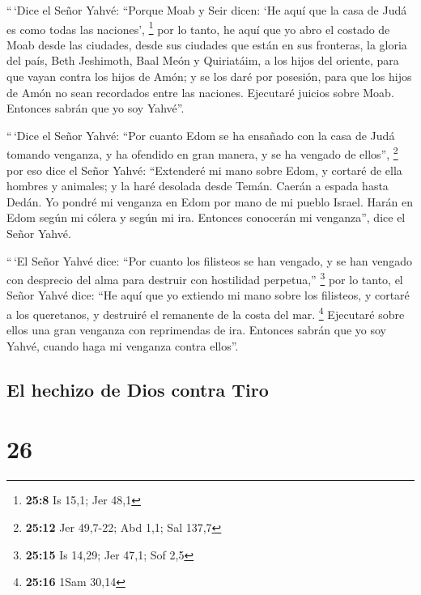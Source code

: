  ``\,`Dice el Señor Yahvé: ``Porque Moab y Seir dicen: `He
aquí que la casa de Judá es como todas las naciones', \footnote{\textbf{25:8}
  Is 15,1; Jer 48,1}  por lo tanto, he aquí que yo abro el
costado de Moab desde las ciudades, desde sus ciudades que están en sus
fronteras, la gloria del país, Beth Jeshimoth, Baal Meón y Quiriatáim,
 a los hijos del oriente, para que vayan contra los hijos
de Amón; y se los daré por posesión, para que los hijos de Amón no sean
recordados entre las naciones.  Ejecutaré juicios sobre
Moab. Entonces sabrán que yo soy Yahvé''.

 ``\,`Dice el Señor Yahvé: ``Por cuanto Edom se ha
ensañado con la casa de Judá tomando venganza, y ha ofendido en gran
manera, y se ha vengado de ellos'', \footnote{\textbf{25:12} Jer
  49,7-22; Abd 1,1; Sal 137,7}  por eso dice el Señor
Yahvé: ``Extenderé mi mano sobre Edom, y cortaré de ella hombres y
animales; y la haré desolada desde Temán. Caerán a espada hasta Dedán.
 Yo pondré mi venganza en Edom por mano de mi pueblo
Israel. Harán en Edom según mi cólera y según mi ira. Entonces conocerán
mi venganza'', dice el Señor Yahvé.

 ``\,`El Señor Yahvé dice: ``Por cuanto los filisteos se
han vengado, y se han vengado con desprecio del alma para destruir con
hostilidad perpetua,'' \footnote{\textbf{25:15} Is 14,29; Jer 47,1; Sof
  2,5}  por lo tanto, el Señor Yahvé dice: ``He aquí que
yo extiendo mi mano sobre los filisteos, y cortaré a los queretanos, y
destruiré el remanente de la costa del mar. \footnote{\textbf{25:16}
  1Sam 30,14}  Ejecutaré sobre ellos una gran venganza
con reprimendas de ira. Entonces sabrán que yo soy Yahvé, cuando haga mi
venganza contra ellos''.

\hypertarget{el-hechizo-de-dios-contra-tiro}{%
\subsection{El hechizo de Dios contra
Tiro}\label{el-hechizo-de-dios-contra-tiro}}

\hypertarget{section-25}{%
\section{26}\label{section-25}}

